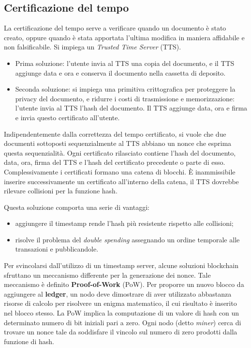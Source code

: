 \subsection{Certificazione del tempo}
La certificazione del tempo serve a verificare quando un documento è stato creato, oppure quando è stata apportata l'ultima modifica in maniera affidabile e non falsificabile. Si impiega un \textit{Trusted Time Server} (TTS).
\begin{itemize}
    \item Prima soluzione: l'utente invia al TTS una copia del documento, e il TTS aggiunge data e ora e conserva il documento nella cassetta di deposito.
    \item Seconda soluzione: si impiega una primitiva crittografica per proteggere la privacy del documento, e ridurre i costi di trasmissione e memorizzazione: l'utente invia al TTS l'hash del documento. Il TTS aggiunge data, ora e firma e invia questo certificato all'utente.
\end{itemize}
Indipendentemente dalla correttezza del tempo certificato, si vuole che due documenti sottoposti sequenzialmente al TTS abbiano un nonce che esprima questa sequenzialità. Ogni certificato rilasciato contiene l'hash del documento, data, ora, firma del TTS e l'hash del certificato precedente o parte di esso. Complessivamente i certificati formano una catena di blocchi. È inammissibile inserire successivamente un certificato all'interno della catena, il TTS dovrebbe rilevare collisioni per la funzione hash.

Questa soluzione comporta una serie di vantaggi:
\begin{itemize}
    \item aggiungere il timestamp rende l'hash più resistente rispetto alle collisioni;
    \item risolve il problema del \textit{double spending} assegnando un ordine temporale alle transazioni e pubblicandole.
\end{itemize}
Per svincolarsi dall'utilizzo di un timestamp server, alcune soluzioni blockchain sfruttano un meccanismo differente per la generazione dei nonce. Tale meccanismo è definito \textbf{Proof-of-Work} (PoW). Per proporre un nuovo blocco da aggiungere al \textbf{ledger}, un nodo deve dimostrare di aver utilizzato abbastanza risorse di calcolo per risolvere un enigma matematico, il cui risultato è inserito nel blocco stesso. La PoW implica la computazione di un valore di hash con un determinato numero di bit iniziali pari a zero. Ogni nodo (detto \textit{miner}) cerca di trovare un nonce tale da soddisfare il vincolo sul numero di zero prodotti dalla funzione di hash.

